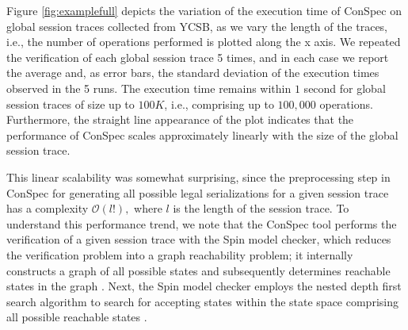 \documentclass[conference]{IEEEtran}
\begin{document}
	
	Figure \ref{fig:examplefull} depicts the variation of the execution time of ConSpec on global session  traces collected from YCSB, as we vary the length of the traces, i.e., the number of operations performed is plotted along the x axis. We repeated the verification of each global session trace 5 times,  and in each case we report the average and, as error bars, the standard deviation of the execution times observed in the 5 runs.
	The execution time remains within $1$ second for global session traces of size up to $100K$, i.e., comprising up to $100,000$  operations. Furthermore, the straight line appearance of the plot indicates that the performance of ConSpec scales approximately linearly with the size of the global session trace.
	\par This linear scalability was somewhat surprising, since the preprocessing step in ConSpec for generating all possible legal serializations for a given session trace has a complexity $\mathcal{O}(\mathit{l}!),$ where $\mathit{l}$ is the length of the session trace. To understand this performance trend, we note that the ConSpec tool performs the verification of a given session trace with the  Spin model checker, which reduces the verification problem into a graph reachability problem; it internally constructs a graph of all possible states and subsequently determines  reachable states in the graph \cite{Holzmann:1997:MCS:260897.260902}. Next, the Spin model checker  employs the nested depth first search algorithm \cite{DBLP:conf/dimacs/HolzmannPY96} to search for accepting states within the state space comprising all possible reachable states \cite{DBLP:conf/tacas/SchwoonE05}.
\end{document}

